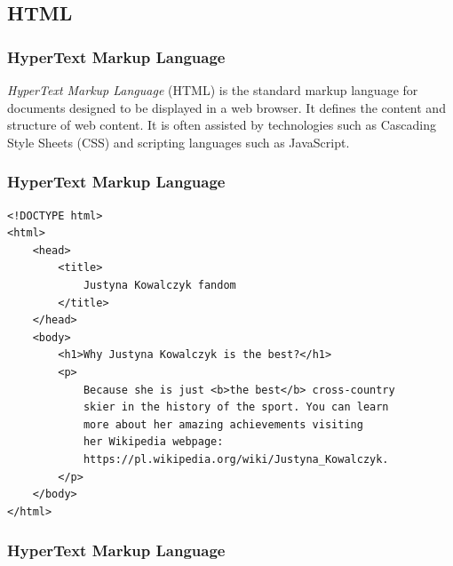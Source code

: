 \documentclass[aspectratio=169]{beamer}
\begin{document}
\subsection{HTML}

\begin{frame}
    \frametitle{HyperText Markup Language}
    \begin{definition}{}
        \emph{HyperText Markup Language} (HTML) is the standard markup language for
        documents designed to be displayed in a web browser. It defines the
        content and structure of web content. It is often assisted by
        technologies such as Cascading Style Sheets (CSS) and scripting
        languages such as JavaScript.
    \end{definition}
\end{frame}

\begin{frame}[fragile]
\frametitle{HyperText Markup Language}
\begin{verbatim}
<!DOCTYPE html>
<html>
    <head>
        <title>
            Justyna Kowalczyk fandom
        </title>
    </head>
    <body>
        <h1>Why Justyna Kowalczyk is the best?</h1>
        <p>
            Because she is just <b>the best</b> cross-country 
            skier in the history of the sport. You can learn
            more about her amazing achievements visiting
            her Wikipedia webpage:
            https://pl.wikipedia.org/wiki/Justyna_Kowalczyk.
        </p>
    </body>
</html>
\end{verbatim}
\end{frame}

\begin{frame}
    \frametitle{HyperText Markup Language}
\end{frame}
\end{document}
